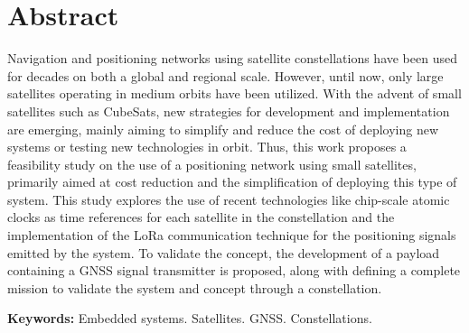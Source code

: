 %
%
%
%
%

%
%
%
%
%

\chapter*{Abstract}

{\parindent0pt
Navigation and positioning networks using satellite constellations have been used for decades on both a global and regional scale. However, until now, only large satellites operating in medium orbits have been utilized. With the advent of small satellites such as CubeSats, new strategies for development and implementation are emerging, mainly aiming to simplify and reduce the cost of deploying new systems or testing new technologies in orbit. Thus, this work proposes a feasibility study on the use of a positioning network using small satellites, primarily aimed at cost reduction and the simplification of deploying this type of system. This study explores the use of recent technologies like chip-scale atomic clocks as time references for each satellite in the constellation and the implementation of the LoRa communication technique for the positioning signals emitted by the system. To validate the concept, the development of a payload containing a GNSS signal transmitter is proposed, along with defining a complete mission to validate the system and concept through a constellation.
}

\smallskip
\noindent \textbf{Keywords:} Embedded systems. Satellites. GNSS. Constellations.